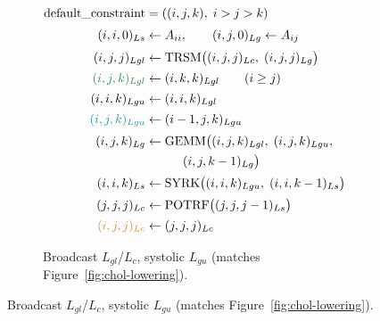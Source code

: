 \documentclass[sigplan, nonacm]{acmart}
\newenvironment{codepanel}{%
  \begin{lrbox}{\codepanelbox}%
  \begin{minipage}{\dimexpr\linewidth-8pt\relax}%
}{%
  \end{minipage}%
  \end{lrbox}%
  \setlength{\fboxsep}{4pt}%
  \colorbox{codebg}{\usebox{\codepanelbox}}%
}
\begin{document}
\begin{figure}[t]
\centering
\small
\begin{subfigure}[t]{\linewidth}
\centering
\begin{codepanel}
\begin{minipage}{\linewidth}
\raggedright
\noindent
\(\displaystyle
\begin{aligned}
\text{default\_constraint}
&= ((i, j, k),\; i > j > k) \\[0.25em]
(i, i, 0)_{Ls} &\leftarrow A_{ii},
\qquad
(i, j, 0)_{Lg} \leftarrow A_{ij} \\[0.2em]
(i, j, j)_{Lgl}
&\leftarrow \text{TRSM}\big(
  (i, j, j)_{Lc},\;
  (i, j, j)_{Lg}
\big) \\[0.15em]
\color{commhop}
(i, j, k)_{Lgl}
&\leftarrow (i, k, k)_{Lgl}
\qquad (i \ge j) \\[0.15em]
\color{black}
(i, i, k)_{Lgu}
&\leftarrow (i, i, k)_{Lgl} \\[0.15em]
\color{commtree}
(i, j, k)_{Lgu}
&\leftarrow (i - 1, j, k)_{Lgu} \\[0.15em]
\color{black}
(i, j, k)_{Lg}
&\leftarrow \text{GEMM}\big(
  (i, j, k)_{Lgl},\;
  (i, j, k)_{Lgu}, \\
&\qquad\quad
  (i, j, k - 1)_{Lg}
\big) \\[0.15em]
(i, i, k)_{Ls}
&\leftarrow \text{SYRK}\big(
  (i, i, k)_{Lgu},\;
  (i, i, k - 1)_{Ls}
\big) \\[0.15em]
(j, j, j)_{Lc}
&\leftarrow \text{POTRF}\big(
  (j, j, j - 1)_{Ls}
\big) \\[0.15em]
\color{commfact}
(i, j, j)_{Lc}
&\leftarrow (j, j, j)_{Lc}
\end{aligned}
\)
\end{minipage}
\end{codepanel}
\caption{Broadcast $L_{gl}$/$L_c$, systolic $L_{gu}$ (matches Figure~\ref{fig:chol-lowering}).}
\label{fig:chol-dataflow-bcast}
\end{subfigure}

\vspace{0.45em}


\end{figure}
\end{document}

